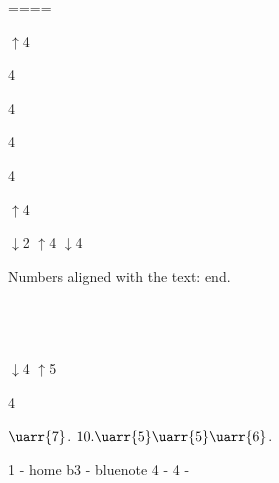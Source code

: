 \newpage
  
  
  
  ====



  $\uparrow$4 



  4   


  4 

  4 





  4 


 



  $\uparrow$4 

{$\downarrow$2} {} $\uparrow$4 {} {$\downarrow$4} 




Numbers aligned with the text:     end.
\\




    \\ 

\\
\\

\hookdownarrow{}

$\downarrow$4
$\uparrow$5
	
  4




$\uarr{7}$.
$10.\uarr{5}\uarr{5}\uarr{6}$.




\Downarrow	
\Uparrow

1 - home
b3 - bluenote
4 - 
4 -








